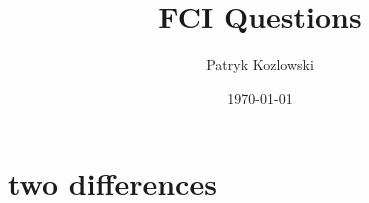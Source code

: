 \documentclass[12pt]{article}
\title{FCI Questions}
\author{Patryk Kozlowski}
\date{\today}
\begin{document}
\maketitle
\section{two differences}

\end{document}
